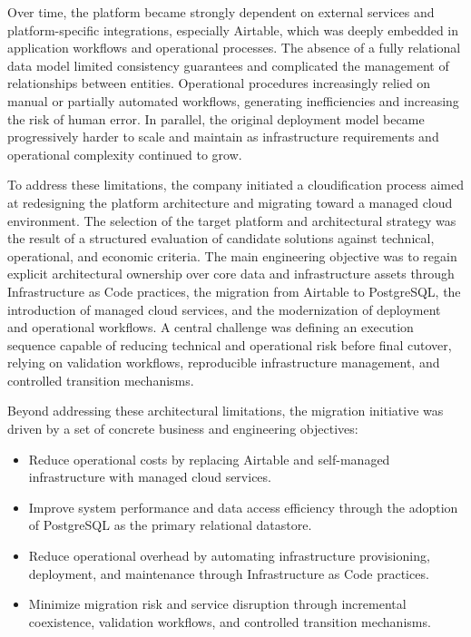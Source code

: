 Over time, the platform became strongly dependent on external services and platform-specific integrations, especially Airtable, which was deeply embedded in application workflows and operational processes. The absence of a fully relational data model limited consistency guarantees and complicated the management of relationships between entities. Operational procedures increasingly relied on manual or partially automated workflows, generating inefficiencies and increasing the risk of human error. In parallel, the original deployment model became progressively harder to scale and maintain as infrastructure requirements and operational complexity continued to grow.

To address these limitations, the company initiated a cloudification process aimed at redesigning the platform architecture and migrating toward a managed cloud environment. The selection of the target platform and architectural strategy was the result of a structured evaluation of candidate solutions against technical, operational, and economic criteria. The main engineering objective was to regain explicit architectural ownership over core data and infrastructure assets through Infrastructure as Code practices, the migration from Airtable to PostgreSQL, the introduction of managed cloud services, and the modernization of deployment and operational workflows. A central challenge was defining an execution sequence capable of reducing technical and operational risk before final cutover, relying on validation workflows, reproducible infrastructure management, and controlled transition mechanisms.

Beyond addressing these architectural limitations, the migration initiative was driven by a set of concrete business and engineering objectives:

\begin{itemize}
    \item Reduce operational costs by replacing Airtable and self-managed infrastructure with managed cloud services.
    
    \item Improve system performance and data access efficiency through the adoption of PostgreSQL as the primary relational datastore.
    
    \item Reduce operational overhead by automating infrastructure provisioning, deployment, and maintenance through Infrastructure as Code practices.
        
    \item Minimize migration risk and service disruption through incremental coexistence, validation workflows, and controlled transition mechanisms.
    
\end{itemize}


